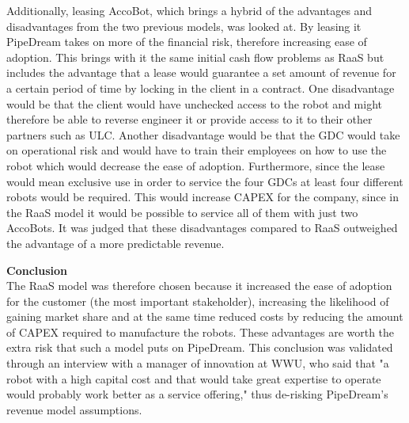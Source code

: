 \documentclass[11pt]{article}		%
\newcommand{\supercite}[1]{\textsuperscript{\cite{#1}}}		%
\begin{document}
           Additionally, leasing AccoBot, which brings a hybrid of the advantages and disadvantages from the two previous models, was looked at. By leasing it PipeDream takes on more of the financial risk, therefore increasing ease of adoption. This brings with it the same initial cash flow problems as RaaS but includes the advantage that a lease would guarantee a set amount of revenue for a certain period of time by locking in the client in a contract. One disadvantage would be that the client would have unchecked access to the robot and might therefore be able to reverse engineer it or provide access to it to their other partners such as ULC. Another disadvantage would be that the GDC would take on operational risk and would have to train their employees on how to use the robot which would decrease the ease of adoption. Furthermore, since the lease would mean exclusive use in order to service the four GDCs at least four different robots would be required. This would increase CAPEX for the company, since in the RaaS model it would be possible to service all of them with just two AccoBots. It was judged that these  disadvantages compared to RaaS outweighed the advantage of a more predictable revenue.
           
            \textbf{Conclusion}
            \\
           The RaaS model was therefore chosen because it increased the ease of adoption for the customer (the most important stakeholder), increasing the likelihood of gaining market share and at the same time reduced costs by reducing the amount of CAPEX required to manufacture the robots. These advantages are worth the extra risk that such a model puts on PipeDream. This conclusion was validated through an interview with a manager of innovation at WWU, who said that "a robot with a high capital cost and that would take great expertise to operate would probably work better as a service offering," thus de-risking PipeDream's revenue model assumptions.
           
\end{document}
